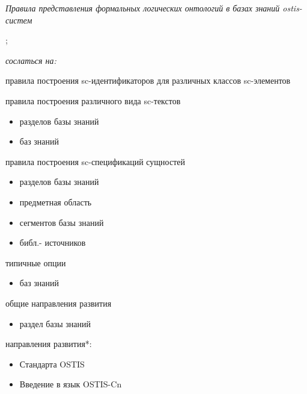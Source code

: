 \begin{SCn}
{{{\begin{scnitemize}
			\item\textit{Правила представления формальных логических онтологий в базах знаний ostis-систем}
		\end{scnitemize}};
	}}
\textit{сослаться на:}
\begin{scnitemize}
	\item правила построения sc-идентификаторов для различных классов sc-элементов
	\item правила построения различного вида sc-текстов
	\begin{itemize}
		\item разделов базы знаний
		\item баз знаний	
	\end{itemize}	
\end{scnitemize}
\begin{scnitemize}
	\item правила построения sc-спецификаций сущностей
	\begin{itemize}
		\item разделов базы знаний
		\item предметная область
		\item сегментов базы знаний
		\item библ.- источников	
	\end{itemize}	
\end{scnitemize}
\begin{scnitemize}
	\item типичные опции
	\begin{itemize}
		\item баз знаний	
	\end{itemize}	
\end{scnitemize}
\begin{scnitemize}
	\item общие направления развития
	\begin{itemize}
		\item раздел базы знаний	
	\end{itemize}	
\end{scnitemize}
\begin{scnitemize}
	\item направления развития*:
	\begin{itemize}
		\item Стандарта OSTIS
		\item Введение в язык OSTIS-Cn	

\end{itemize}
\end{scnitemize}
\end{SCn}
